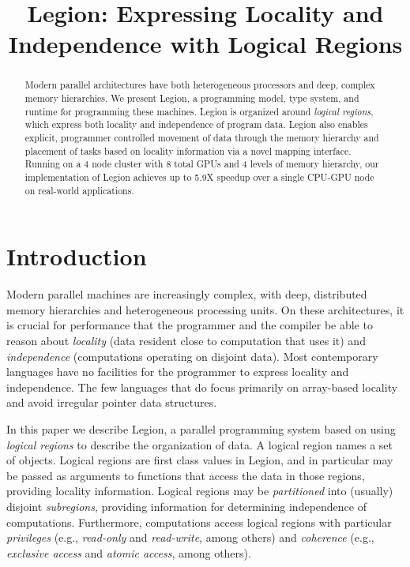 \documentclass[9pt,nocopyrightspace]{sigplanconf}
\begin{document}
\title{Legion: Expressing Locality and Independence with Logical Regions}
\authorinfo{}{}{}
\maketitle

\begin{abstract}
Modern parallel architectures have both
heterogeneous processors and deep, complex memory hierarchies.  
We present Legion, 
a programming model, type system, and runtime for programming these machines.
Legion is organized around {\em logical regions}, which express both locality and independence of program data.  
Legion also enables explicit, programmer controlled movement of data through
the memory hierarchy and placement of tasks based on locality information
via a novel mapping interface.  Running on a 4 node cluster with 8 total GPUs 
and 4 levels of memory hierarchy, our implementation of Legion 
achieves up to 5.9X speedup over a single CPU-GPU node on real-world applications.
\end{abstract}

\section{Introduction}
\label{sect:intro}
Modern parallel machines are increasingly complex, with deep,
distributed memory hierarchies and heterogeneous processing units.  On
these architectures, it is crucial for performance that the programmer
and the compiler be able to reason about {\em locality} (data resident
close to computation that uses it) and {\em independence} (computations
operating on disjoint data).  Most contemporary
languages have no facilities for the programmer to express locality
and independence.  The few languages that do focus primarily on
array-based locality \cite{Fatahalian06,CHAPEL04,UPC99} and 
avoid irregular pointer data structures.

In this paper we describe Legion, a parallel programming system based
on using {\em logical regions} to describe the organization of data.
A logical region names a set of objects.  Logical regions are first
class values in Legion, and in particular may be passed as arguments
to functions that access the data in those regions, providing locality
information.  Logical regions may be {\em partitioned} into (usually)
disjoint {\em subregions}, providing information for determining independence of computations.  Furthermore,
computations access logical regions with particular {\em privileges} (e.g., {\em
  read-only} and {\em read-write}, among others) 
and {\em coherence} (e.g., {\em exclusive access} and {\em atomic access}, among others).
\end{document}
